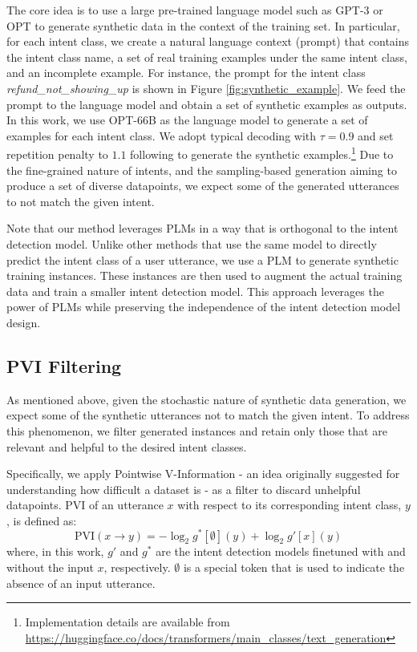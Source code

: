 \documentclass[11pt]{article}
\begin{document}
The core idea is to use a large pre-trained language model such as GPT-3 \cite{DBLP:conf/nips/BrownMRSKDNSSAA20} or OPT \cite{DBLP:journals/corr/abs-2205-01068} to generate synthetic data in the context of the training set.
In particular, for each intent class, we create a natural language context (prompt) that contains the intent class name, a set of real training examples under the same intent class, and an incomplete example.
For instance, the prompt for the intent class \textit{refund\_not\_showing\_up} is shown in Figure \ref{fig:synthetic_example}.
We feed the prompt to the language model and obtain a set of synthetic examples as outputs.
In this work, we use OPT-66B \cite{DBLP:journals/corr/abs-2205-01068}  as the language model to generate a set of examples for each intent class.
We adopt typical decoding
with $\tau = 0.9$ \cite{DBLP:journals/corr/abs-2202-00666} and set repetition penalty to $1.1$ following \citet{DBLP:journals/corr/abs-1909-05858} to generate the synthetic examples.\footnote{Implementation details are available from \url{https://huggingface.co/docs/transformers/main_classes/text_generation}}
Due to the fine-grained nature of  intents, and the sampling-based generation aiming to produce a set of diverse datapoints, we expect some of the generated utterances to not match the given intent.

Note that our method leverages PLMs in a way that is  orthogonal to the intent detection model.
Unlike other methods that use the same model to directly predict the intent class of a user utterance, we use a PLM to generate synthetic training instances. These instances are then used to augment the actual training data and train a smaller intent detection model.
This approach leverages the power of PLMs while preserving the independence of the intent detection model design.

\subsection{PVI Filtering}
\label{sec:filtering}
As mentioned above, given the stochastic nature of synthetic data generation, we expect some of the synthetic utterances not to match the given intent. To address this phenomenon, we filter generated instances and retain only those that are relevant and helpful to the desired intent classes.

Specifically, we apply Pointwise V-Information \cite{DBLP:conf/icml/EthayarajhCS22} - an idea originally suggested for understanding how difficult a dataset is - as a filter to discard unhelpful datapoints.
PVI of an utterance $x$ with respect to its corresponding intent class, $y$, is defined as:
\[
\mathrm{PVI}(x \to y) = -\log_2 g^* [\emptyset] (y) + \log_2 g' [x] (y)
\]
where, in this work, $g'$ and $g^*$ are the intent detection models finetuned with and without the input $x$, respectively. 
$\emptyset$ is a special token that is used to indicate the absence of an input utterance.
\end{document}
